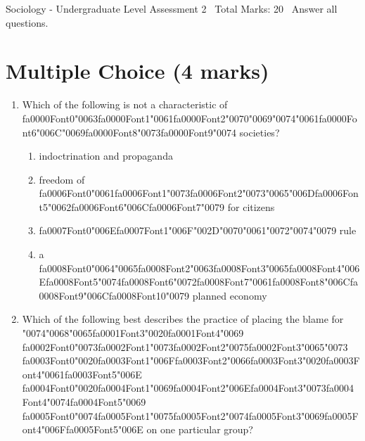 \documentclass[12pt]{article}
\begin{document}
\begin{center}
Sociology - Undergraduate Level Assessment 2 \
Total Marks: 20 \
Answer all questions.
\end{center}

\section*{Multiple Choice (4 marks)}
\begin{enumerate}[label=\arabic*.]
\item Which of the following is not a characteristic of {\csname fa0000Font0\endcsname\char"0063}{\csname fa0000Font1\endcsname\char"0061}{\csname fa0000Font2\endcsname\char"0070}{\char"0069}{\char"0074}{\char"0061}{\csname fa0000Font6\endcsname\char"006C}{\char"0069}{\csname fa0000Font8\endcsname\char"0073}{\csname fa0000Font9\endcsname\char"0074} societies?
\begin{enumerate}[label=(\alph*)]
    \item indoctrination and propaganda
    \item freedom of {\csname fa0006Font0\endcsname\char"0061}{\csname fa0006Font1\endcsname\char"0073}{\csname fa0006Font2\endcsname\char"0073}{\char"0065}{\char"006D}{\csname fa0006Font5\endcsname\char"0062}{\csname fa0006Font6\endcsname\char"006C}{\csname fa0006Font7\endcsname\char"0079} for citizens
    \item {\csname fa0007Font0\endcsname\char"006E}{\csname fa0007Font1\endcsname\char"006F}{\char"002D}{\char"0070}{\char"0061}{\char"0072}{\char"0074}{\char"0079} rule
    \item a {\csname fa0008Font0\endcsname\char"0064}{\char"0065}{\csname fa0008Font2\endcsname\char"0063}{\csname fa0008Font3\endcsname\char"0065}{\csname fa0008Font4\endcsname\char"006E}{\csname fa0008Font5\endcsname\char"0074}{\csname fa0008Font6\endcsname\char"0072}{\csname fa0008Font7\endcsname\char"0061}{\csname fa0008Font8\endcsname\char"006C}{\csname fa0008Font9\endcsname\char"006C}{\csname fa0008Font10\endcsname\char"0079} planned economy
\end{enumerate}
\item Which of the following best describes the practice of placing the blame for {\char"0074}{\char"0068}{\char"0065}{\csname fa0001Font3\endcsname\char"0020}{\csname fa0001Font4\endcsname\char"0069} {\csname fa0002Font0\endcsname\char"0073}{\csname fa0002Font1\endcsname\char"0073}{\csname fa0002Font2\endcsname\char"0075}{\csname fa0002Font3\endcsname\char"0065}{\char"0073} {\csname fa0003Font0\endcsname\char"0020}{\csname fa0003Font1\endcsname\char"006F}{\csname fa0003Font2\endcsname\char"0066}{\csname fa0003Font3\endcsname\char"0020}{\csname fa0003Font4\endcsname\char"0061}{\csname fa0003Font5\endcsname\char"006E} {\csname fa0004Font0\endcsname\char"0020}{\csname fa0004Font1\endcsname\char"0069}{\csname fa0004Font2\endcsname\char"006E}{\csname fa0004Font3\endcsname\char"0073}{\csname fa0004Font4\endcsname\char"0074}{\csname fa0004Font5\endcsname\char"0069} {\csname fa0005Font0\endcsname\char"0074}{\csname fa0005Font1\endcsname\char"0075}{\csname fa0005Font2\endcsname\char"0074}{\csname fa0005Font3\endcsname\char"0069}{\csname fa0005Font4\endcsname\char"006F}{\csname fa0005Font5\endcsname\char"006E} on one particular group?

\end{enumerate}
\end{document}
